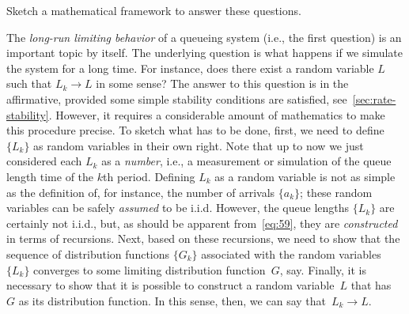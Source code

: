 \begin{extra}
Sketch a mathematical framework to answer  these questions. 

\begin{solution}
  
The \emph{long-run limiting behavior} of a queueing system (i.e., the first question) is an important topic by itself.
The underlying question is what happens if we simulate the system for a long time.
For instance, does there exist a random variable $L$ such that $L_k\to L$ in some sense?
The answer to this question is in the affirmative, provided some simple stability conditions are satisfied, see~\cref{sec:rate-stability}.
However, it requires a considerable amount of mathematics to make this procedure precise.
To sketch what has to be done, first, we need to define $\{L_k\}$ as random variables in their own right.
Note that up to now we just considered each $L_k$ as a \emph{number}, i.e., a measurement or simulation of the queue length time of the $k$th period.
Defining $L_k$ as a random variable is not as simple as the definition of, for instance, the number of arrivals $\{a_k\}$; these random variables can be safely \emph{assumed} to be i.i.d.
However, the queue lengths $\{L_k\}$ are certainly not i.i.d., but, as should be apparent from~\cref{eq:59}, they are \emph{constructed} in terms of recursions.
Next, based on these recursions, we need to show that the sequence of distribution functions $\{G_k\}$ associated with the random variables $\{L_k\}$ converges to some limiting distribution function~$G$, say.
Finally, it is necessary to show that it is possible to construct a random variable~$L$ that has~$G$ as its distribution function.
In this sense, then, we can say that~$L_k \to L$.
\end{solution}

\end{extra}


